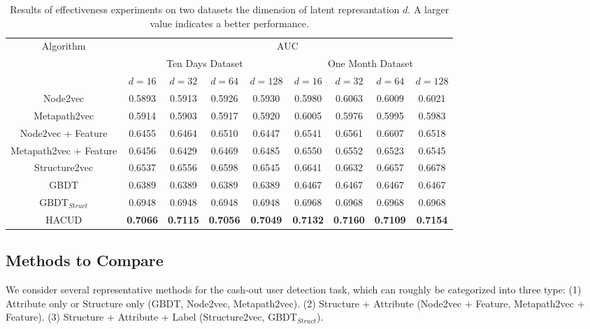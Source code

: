 \begin{table}[t]
\centering
\caption{Results of effectiveness experiments on two datasets \wrt the dimension of latent represantation $d$. A larger value indicates a better performance.} \label{tab-eff}
\begin{tabular}{c|c|c|c|c|c|c|c|c}%
\hline
\multirow{3}{*}{Algorithm} & \multicolumn{8}{|c}{AUC}\\
\cline{2-9}
\multirow{3}{*}{} & \multicolumn{4}{|c}{Ten Days Dataset} & \multicolumn{4}{|c}{One Month Dataset}\\
\cline{2-9}
\multirow{3}{*}{} & {$d = 16$} & {$d = 32$} & {$d = 64$} & {$d = 128$} & {$d = 16$} & {$d = 32$} & {$d = 64$} & {$d = 128$}\\
\hline
Node2vec & 0.5893  &0.5913 & 0.5926 & 0.5930 & 0.5980 & 0.6063 & 0.6009 & 0.6021\\
Metapath2vec & 0.5914 & 0.5903 & 0.5917 & 0.5920 & 0.6005& 0.5976 &  0.5995 & 0.5983\\
{Node2vec + Feature}  & 0.6455 & 0.6464  & 0.6510 & 0.6447 & 0.6541 & 0.6561 & 0.6607 & 0.6518\\
{Metapath2vec + Feature}  & 0.6456 &  0.6429 & 0.6469 & 0.6485 & 0.6550 & 0.6552& 0.6523 & 0.6545\\
Structure2vec & 0.6537 & 0.6556 & 0.6598 & 0.6545 & 0.6641 &0.6632 & 0.6657 & 0.6678\\
GBDT & 0.6389 & 0.6389 & 0.6389 & 0.6389 & 0.6467 & 0.6467 & 0.6467 & 0.6467\\

GBDT$_{Struct}$& 0.6948 & 0.6948 & 0.6948 & 0.6948 & 0.6968 & 0.6968 & 0.6968 & 0.6968\\

HACUD & \textbf{0.7066} & \textbf{0.7115} & \textbf{0.7056}& \textbf{0.7049} &\textbf{0.7132} & \textbf{0.7160} & \textbf{0.7109}&\textbf{0.7154}\\
\hline
\end{tabular}
\end{table}

\subsection{Methods to Compare}
We consider several representative methods for the cash-out user detection task,
which  can roughly be categorized into three type: (1) Attribute only or Structure only (GBDT, Node2vec, Metapath2vec). (2) Structure + Attribute (Node2vec + Feature, Metapath2vec + Feature). (3) Structure + Attribute + Label (Structure2vec, GBDT$_{Struct}$).


